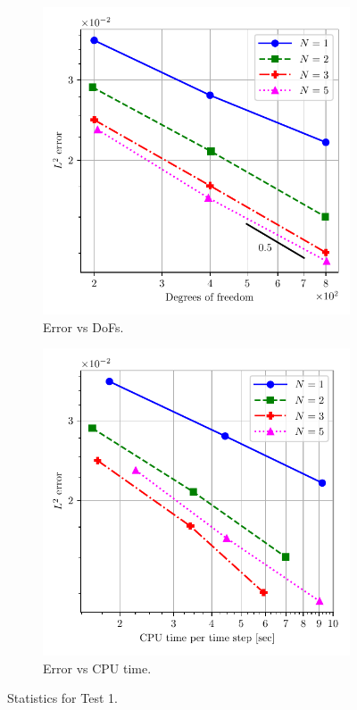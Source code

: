 \documentclass[a4paper,11pt,oneside]{article}
\begin{document}
\begin{figure}[htbp]
	\centering
	\begin{subfigure}{0.5\linewidth}
		\includegraphics[width=\linewidth]{figures/riemann_1d/test1-1/error_vs_dof_chandrashekhar.pdf}
		\caption{Error vs DoFs.}
		\label{subfig:test1-1_error_vs_dof_chandrashekhar}
	\end{subfigure}%
	\begin{subfigure}{0.5\linewidth}
		\includegraphics[width=\linewidth]{figures/riemann_1d/test1-1/error_vs_cputime_chandrashekhar.pdf}
		\caption{Error vs CPU time.}
		\label{subfig:test1-1_error_vs_cputime_chandrashekhar}
	\end{subfigure}
	\caption{Statistics for Test 1.}
	\label{fig:test1-1_error_plots_chandrashekhar}
\end{figure}
\end{document}
